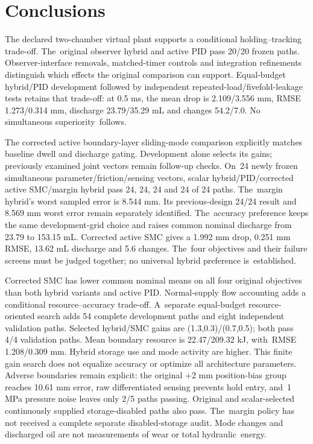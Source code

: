 \documentclass[machines,article,submit,pdftex,moreauthors]{Definitions/mdpi}
\begin{document}
\section{Conclusions}
The declared two-chamber virtual plant supports a conditional holding--tracking trade-off. The~original observer hybrid and active PID pass 20/20 frozen paths. Observer-interface removals, matched-timer controls and integration refinements distinguish which effects the original comparison can support. Equal-budget hybrid/PID development followed by independent repeated-load/fivefold-leakage tests retains that trade-off: at 0.5 ms, the mean drop is 2.109/3.556 mm, RMSE 1.273/0.314 mm, discharge 23.79/35.29 mL and changes 54.2/7.0. No simultaneous superiority~follows.

The corrected active boundary-layer sliding-mode comparison explicitly matches baseline dwell and discharge gating. Development alone selects its gains; previously examined joint vectors remain follow-up checks. On~24 newly frozen simultaneous parameter/friction/sensing vectors, scalar hybrid/PID/corrected active SMC/margin hybrid pass 24, 24, 24 and 24 of 24 paths. The~margin hybrid's worst sampled error is 8.544 mm. Its previous-design 24/24 result and 8.569 mm worst error remain separately identified. The~accuracy preference keeps the same development-grid choice and raises common nominal discharge from 23.79 to 153.15 mL. Corrected active SMC gives a 1.992 mm drop, 0.251 mm RMSE, 13.62 mL discharge and 5.6 changes. The~four objectives and their failure screens must be judged together; no universal hybrid preference is~established.

Corrected SMC has lower common nominal means on all four original objectives than both hybrid variants and active PID. Normal-supply flow accounting adds a conditional resource--accuracy trade-off. A~separate equal-budget resource-oriented search adds 54 complete development paths and eight independent validation paths. Selected hybrid/SMC gains are (1.3,0.3)/(0.7,0.5); both pass 4/4 validation paths. Mean boundary resource is 22.47/209.32 kJ, with~RMSE 1.208/0.309 mm. Hybrid storage use and mode activity are higher. This finite gain search does not equalize accuracy or optimize all architecture parameters. Adverse boundaries remain explicit: the original +2 mm position-bias group reaches 10.61 mm error, raw differentiated sensing prevents hold entry, and~1 MPa pressure noise leaves only 2/5 paths passing. Original and scalar-selected continuously supplied storage-disabled paths also pass. The~margin policy has not received a complete separate disabled-storage audit. Mode changes and discharged oil are not measurements of wear or total hydraulic~energy.
\end{document}
